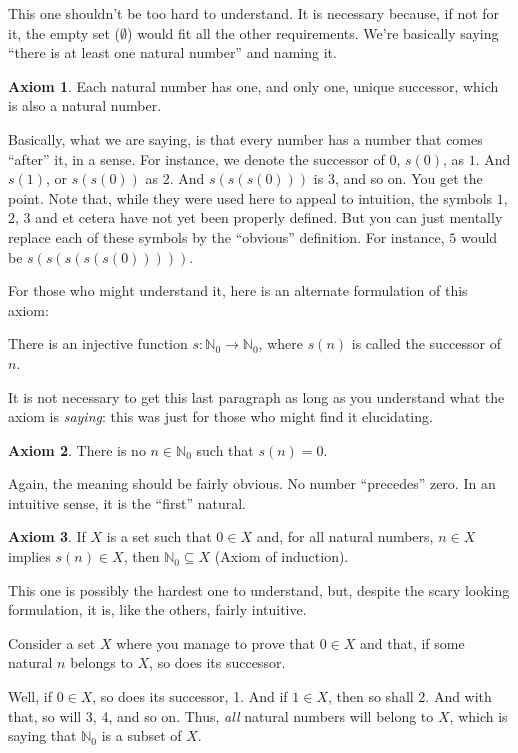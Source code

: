 \documentclass[12pt,a4paper]{article}
\theoremstyle{definition}
\theoremstyle{definition}
\newtheorem{axiom}{Axiom}
\theoremstyle{plain}
\theoremstyle{plain}
\newcommand{\N}{\mathbb{N}}
\begin{document}
	This one shouldn't be too hard to understand. It is necessary because, if not for it, the empty set ($\emptyset$) would fit all the other requirements. We're basically saying ``there is at least one natural number'' and naming it.
	
	\begin{axiom}
		Each natural number has one, and only one, unique successor, which is also a natural number.
	\end{axiom}
	
	Basically, what we are saying, is that every number has a number that comes ``after'' it, in a sense. For instance, we denote the successor of 0, $s(0)$, as $1$. And $s(1)$, or $s(s(0))$ as $2$. And $s(s(s(0)))$ is $3$, and so on. You get the point. Note that, while they were used here to appeal to intuition, the symbols $1$, $2$, $3$ and et cetera have not yet been properly defined. But you can just mentally replace each of these symbols by the ``obvious'' definition. For instance, $5$ would be $s(s(s(s(s(0)))))$.
	
	For those who might understand it, here is an alternate formulation of this axiom:
	
	There is an injective function $s : \N_0 \to \N_0$, where $s(n)$ is called the successor of $n$.
	
	It is not necessary to get this last paragraph as long as you understand what the axiom is \emph{saying}: this was just for those who might find it elucidating.
	
	\begin{axiom}
		There is no $n \in \N_0$ such that $s(n) = 0$.
	\end{axiom}
	
	Again, the meaning should be fairly obvious. No number ``precedes'' zero. In an intuitive sense, it is the ``first'' natural.
	
	\begin{axiom}
		If $X$ is a set such that $0 \in X$ and, for all natural numbers, $n \in X$ implies $s(n) \in X$, then $\N_0 \subseteq X$ (Axiom of induction).
	\end{axiom}
	
	This one is possibly the hardest one to understand, but, despite the scary looking formulation, it is, like the others, fairly intuitive.
	
	Consider a set $X$ where you manage to prove that $0 \in X$ and that, if some natural $n$ belongs to $X$, so does its successor.
	
	Well, if $0 \in X$, so does its successor, 1. And if $1 \in X$, then so shall 2. And with that, so will 3, 4, and so on. Thus, \emph{all} natural numbers will belong to $X$, which is saying that $\N_0$ is a subset of $X$.
	
\end{document}
